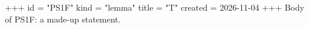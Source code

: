 +++
id = "PS1F"
kind = "lemma"
title = "T"
created = 2026-11-04
+++
Body of PS1F: a made-up statement.
